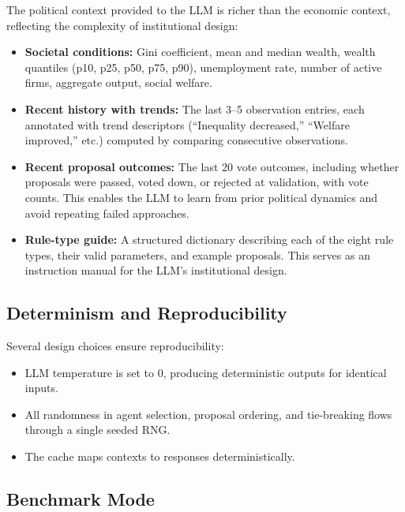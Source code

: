 \documentclass[12pt]{article}
\begin{document}
The political context provided to the LLM is richer than the economic context, reflecting the complexity of institutional design:

\begin{itemize}
  \item \textbf{Societal conditions:} Gini coefficient, mean and median wealth, wealth quantiles (p10, p25, p50, p75, p90), unemployment rate, number of active firms, aggregate output, social welfare.

  \item \textbf{Recent history with trends:} The last 3--5 observation entries, each annotated with trend descriptors (``Inequality decreased,'' ``Welfare improved,'' etc.) computed by comparing consecutive observations.

  \item \textbf{Recent proposal outcomes:} The last 20 vote outcomes, including whether proposals were passed, voted down, or rejected at validation, with vote counts. This enables the LLM to learn from prior political dynamics and avoid repeating failed approaches.

  \item \textbf{Rule-type guide:} A structured dictionary describing each of the eight rule types, their valid parameters, and example proposals. This serves as an instruction manual for the LLM's institutional design.
\end{itemize}


\subsection{Determinism and Reproducibility}\label{sec:llm_determinism}

Several design choices ensure reproducibility:
\begin{itemize}
  \item LLM temperature is set to $0$, producing deterministic outputs for identical inputs.
  \item All randomness in agent selection, proposal ordering, and tie-breaking flows through a single seeded RNG.
  \item The cache maps contexts to responses deterministically.
\end{itemize}


\subsection{Benchmark Mode}\label{sec:benchmark}
\end{document}
